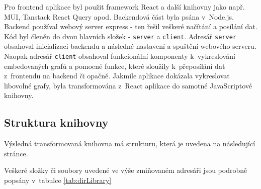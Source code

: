 \documentclass[czech, bc, kiv, he, iso690numb, viewonly]{fasthesis} %
\begin{document}
Pro frontend aplikace byl použit framework React a další knihovny jako např. MUI, Tanstack React Query apod. Backendová část byla psána v~Node.js. Backend používal webový server express - ten
řešil veškeré načítání a posílání dat. Kód byl členěn do dvou hlavních složek - \texttt{server} a \texttt{client}. Adresář \texttt{server} obsahoval inicializaci backendu a následné nastavení a spuštění webového serveru. Naopak
adresář \texttt{client} obsahoval funkcionální komponenty k~vykreslování embedovaných grafů a pomocné funkce, které sloužily k~přeposílání dat z~frontendu na backend či opačně. Jakmile aplikace
dokázala vykreslovat libovolné grafy, byla transformována z~React aplikace do samotné JavaScriptové knihovny.

\subsection{Struktura knihovny}

Výsledná transformovaná knihovna má strukturu, která je uvedena na následující stránce.


Veškeré složky či soubory uvedené ve výše zmiňovaném adresáři jsou podrobně popsány v~tabulce \ref{tab:dirLibrary}
\end{document}
